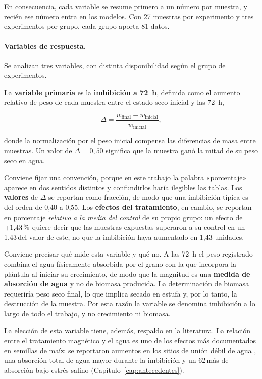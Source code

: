 En consecuencia, cada variable se resume primero a un número por muestra, y recién ese número entra en los modelos. Con 27 muestras por experimento y tres experimentos por grupo, cada grupo aporta 81 datos.

\paragraph{Variables de respuesta.}

Se analizan tres variables, con distinta disponibilidad según el grupo de experimentos.

La \textbf{variable primaria} es la \textbf{imbibición a 72~h}, definida como el aumento relativo de peso de cada muestra entre el estado seco inicial y las 72~h,

\begin{equation}
    \Delta = \frac{w_{\text{final}} - w_{\text{inicial}}}{w_{\text{inicial}}} ,
    \label{eq:pct_change}
\end{equation}

\noindent donde la normalización por el peso inicial compensa las diferencias de masa entre muestras. Un valor de \(\Delta = 0{,}50\) significa que la muestra ganó la mitad de su peso seco en agua.

Conviene fijar una convención, porque en este trabajo la palabra «porcentaje» aparece en dos sentidos distintos y confundirlos haría ilegibles las tablas. Los \textbf{valores} de \(\Delta\) se reportan como fracción, de modo que una imbibición típica es del orden de 0{,}40 a 0{,}55. Los \textbf{efectos del tratamiento}, en cambio, se reportan en porcentaje \emph{relativo a la media del control} de su propio grupo: un efecto de \(+1{,}43\,\text{\%}\) quiere decir que las muestras expuestas superaron a su control en un 1{,}43\,\pct del valor de este, no que la imbibición haya aumentado en 1{,}43 unidades.

Conviene precisar qué mide esta variable y qué no. A las 72~h el peso registrado combina el agua físicamente absorbida por el grano con la que incorpora la plántula al iniciar su crecimiento, de modo que la magnitud es una \textbf{medida de absorción de agua} y no de biomasa producida. La determinación de biomasa requeriría peso seco final, lo que implica secado en estufa y, por lo tanto, la destrucción de la muestra. Por esta razón la variable se denomina imbibición a lo largo de todo el trabajo, y no crecimiento ni biomasa.

La elección de esta variable tiene, además, respaldo en la literatura. La relación entre el tratamiento magnético y el agua es uno de los efectos más documentados en semillas de maíz: se reportaron aumentos en los sitios de unión débil de agua \cite{vashisth_nagarajan_2009, torres_socorro_2018}, una absorción total de agua mayor durante la imbibición \cite{vashisth_nagarajan_2010} y un 62\,\pct más de absorción bajo estrés salino \cite{kataria_2017} (Capítulo~\ref{cap:antecedentes}).

